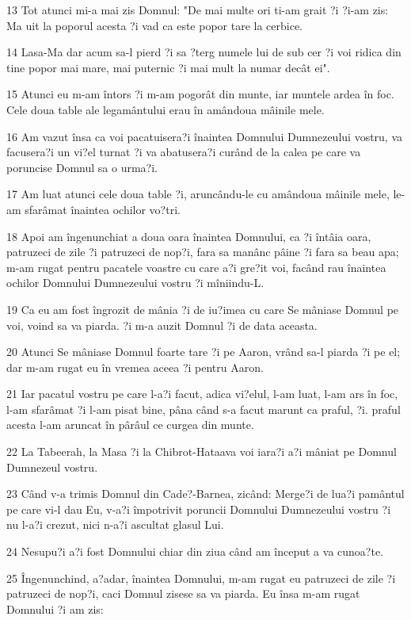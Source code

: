 \par 13 Tot atunci mi-a mai zis Domnul: "De mai multe ori ti-am grait ?i ?i-am zis: Ma uit la poporul acesta ?i vad ca este popor tare la cerbice.
\par 14 Lasa-Ma dar acum sa-l pierd ?i sa ?terg numele lui de sub cer ?i voi ridica din tine popor mai mare, mai puternic ?i mai mult la numar decât ei".
\par 15 Atunci eu m-am întors ?i m-am pogorât din munte, iar muntele ardea în foc. Cele doua table ale legamântului erau în amândoua mâinile mele.
\par 16 Am vazut însa ca voi pacatuisera?i înaintea Domnului Dumnezeului vostru, va facusera?i un vi?el turnat ?i va abatusera?i curând de la calea pe care va poruncise Domnul sa o urma?i.
\par 17 Am luat atunci cele doua table ?i, aruncându-le cu amândoua mâinile mele, le-am sfarâmat înaintea ochilor vo?tri.
\par 18 Apoi am îngenunchiat a doua oara înaintea Domnului, ca ?i întâia oara, patruzeci de zile ?i patruzeci de nop?i, fara sa manânc pâine ?i fara sa beau apa; m-am rugat pentru pacatele voastre cu care a?i gre?it voi, facând rau înaintea ochilor Domnului Dumnezeului vostru ?i mîniindu-L.
\par 19 Ca eu am fost îngrozit de mânia ?i de iu?imea cu care Se mâniase Domnul pe voi, voind sa va piarda. ?i m-a auzit Domnul ?i de data aceasta.
\par 20 Atunci Se mâniase Domnul foarte tare ?i pe Aaron, vrând sa-l piarda ?i pe el; dar m-am rugat eu în vremea aceea ?i pentru Aaron.
\par 21 Iar pacatul vostru pe care l-a?i facut, adica vi?elul, l-am luat, l-am ars în foc, l-am sfarâmat ?i l-am pisat bine, pâna când s-a facut marunt ca praful, ?i. praful acesta l-am aruncat în pârâul ce curgea din munte.
\par 22 La Tabeerah, la Masa ?i la Chibrot-Hataava voi iara?i a?i mâniat pe Domnul Dumnezeul vostru.
\par 23 Când v-a trimis Domnul din Cade?-Barnea, zicând: Merge?i de lua?i pamântul pe care vi-l dau Eu, v-a?i împotrivit poruncii Domnului Dumnezeului vostru ?i nu l-a?i crezut, nici n-a?i ascultat glasul Lui.
\par 24 Nesupu?i a?i fost Domnului chiar din ziua când am început a va cunoa?te.
\par 25 Îngenunchind, a?adar, înaintea Domnului, m-am rugat eu patruzeci de zile ?i patruzeci de nop?i, caci Domnul zisese sa va piarda. Eu însa m-am rugat Domnului ?i am zis:
